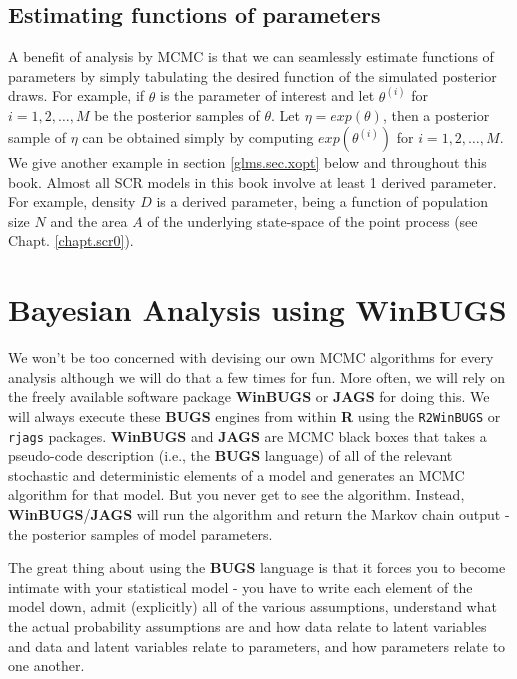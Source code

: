 \subsection{Estimating functions of parameters}

A benefit of analysis by MCMC is that we can seamlessly estimate
functions of parameters by simply tabulating the desired function of
the simulated posterior draws. For example, if $\theta$ is the
parameter of interest and let $\theta^{(i)}$ for $i=1,2,\ldots,M$ be
the posterior samples of $\theta$. Let $\eta = exp(\theta)$, then a
posterior sample of $\eta$ can be obtained simply by computing
$exp(\theta^{(i)})$ for $i=1,2,\ldots,M$. We give another example in
section
\ref{glms.sec.xopt}
below and throughout this book.
Almost all SCR models in this book involve at least 1 derived
parameter. For example, density $D$ is a derived parameter, being a
function of population size $N$ and the area $A$ of the underlying
state-space of the point process (see Chapt. \ref{chapt.scr0}).

\section{Bayesian Analysis using WinBUGS}

We won't be too concerned with devising our own MCMC algorithms for
every analysis
although we will do that a few times for fun.  More often, we
will rely on the freely available software package {\bf WinBUGS} or
{\bf JAGS}
for doing this.  We will always execute these {\bf BUGS} engines from
within {\bf R} using the \mbox{\tt R2WinBUGS} \citep{sturtz_etal:2005}
or 
\mbox{\tt rjags} \citep{plummer:2009} packages. 
{\bf WinBUGS} and {\bf JAGS} are  MCMC black boxes
that takes a pseudo-code description (i.e., the {\bf BUGS}
language) of all of the relevant stochastic
and deterministic elements of a model and generates an MCMC algorithm
for that model. But you never get to see the algorithm. Instead,
{\bf WinBUGS}/{\bf JAGS} will run the 
algorithm and  return the Markov chain output
- the posterior samples of model parameters.

The great thing about using the {\bf BUGS} language is that it forces
you to become intimate with your statistical model - you have to write
each element of the model down, admit (explicitly) all of the various
assumptions, understand what the actual probability assumptions are
and how data relate to latent variables and data and latent variables
relate to parameters, and how parameters relate to one another.

